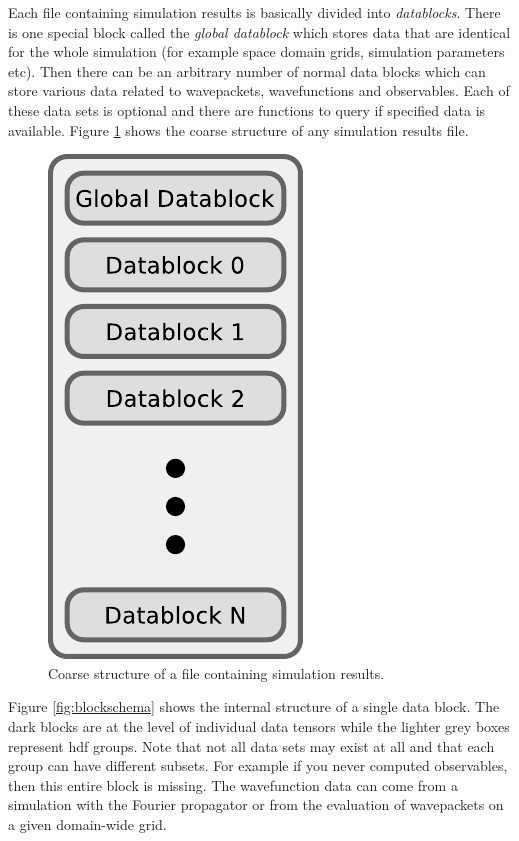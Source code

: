 \documentclass[a4paper,10pt]{report}
\begin{document}
Each file containing simulation results is basically divided into \emph{datablocks}.
There is one special block called the \emph{global datablock} which stores
data that are identical for the whole simulation (for example space domain grids,
simulation parameters etc). Then there can be an arbitrary number of normal data
blocks which can store various data related to wavepackets, wavefunctions and observables.
Each of these data sets is optional and there are functions to query if specified
data is available. Figure \ref{fig:hdfschema} shows the coarse structure of any
simulation results file.

\begin{figure}
  \centering
  \includegraphics[scale=0.75]{./fig/structure_result_file.pdf}
  \caption{Coarse structure of a file containing simulation results.}
  \label{fig:hdfschema}
\end{figure}

Figure \ref{fig:blockschema} shows the internal structure of a single data
block. The dark blocks are at the level of individual data tensors while the
lighter grey boxes represent hdf groups. Note that not all data sets may exist
at all and that each group can have different subsets. For example if you never
computed observables, then this entire block is missing. The wavefunction data
can come from a simulation with the Fourier propagator or from the evaluation
of wavepackets on a given domain-wide grid.
\end{document}
